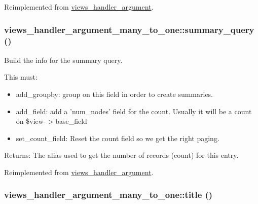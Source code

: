 Reimplemented from \hyperlink{classviews__handler__argument_ad03acefdb44288d7e6c7793bc33f66c}{views\_\-handler\_\-argument}.\hypertarget{classviews__handler__argument__many__to__one_320b34f2327cb15467353d2534d71ddd}{
\subsubsection[{summary\_\-query}]{\setlength{\rightskip}{0pt plus 5cm}views\_\-handler\_\-argument\_\-many\_\-to\_\-one::summary\_\-query ()}}
\label{classviews__handler__argument__many__to__one_320b34f2327cb15467353d2534d71ddd}


Build the info for the summary query.

This must:\begin{itemize}
\item add\_\-groupby: group on this field in order to create summaries.\item add\_\-field: add a 'num\_\-nodes' field for the count. Usually it will be a count on \$view-$>$base\_\-field\item set\_\-count\_\-field: Reset the count field so we get the right paging.\end{itemize}


\begin{Desc}
\item[Returns:]The alias used to get the number of records (count) for this entry. \end{Desc}


Reimplemented from \hyperlink{classviews__handler__argument_1dd6cc301b1c7c1c6829c59eb641a883}{views\_\-handler\_\-argument}.\hypertarget{classviews__handler__argument__many__to__one_624565fe59482f017f2f7935037d9297}{
\subsubsection[{title}]{\setlength{\rightskip}{0pt plus 5cm}views\_\-handler\_\-argument\_\-many\_\-to\_\-one::title ()}}
\label{classviews__handler__argument__many__to__one_624565fe59482f017f2f7935037d9297}


